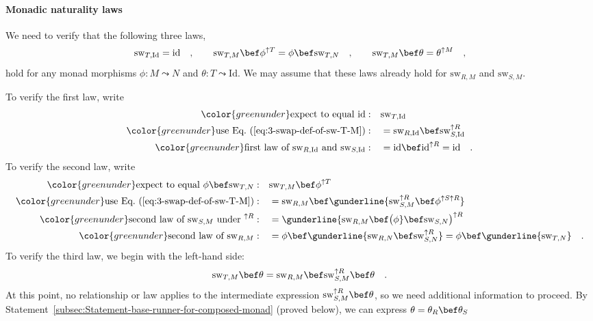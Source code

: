 \paragraph{Monadic naturality laws}

We need to verify that the following three laws,
\[
\text{sw}_{T,\text{Id}}=\text{id}\quad,\quad\quad\text{sw}_{T,M}\bef\phi^{\uparrow T}=\phi\bef\text{sw}_{T,N}\quad,\quad\quad\text{sw}_{T,M}\bef\theta=\theta^{\uparrow M}\quad,
\]
hold for any monad morphisms $\phi:M\leadsto N$ and $\theta:T\leadsto\text{Id}$.
We may assume that these laws already hold for $\text{sw}_{R,M}$
and $\text{sw}_{S,M}$.

To verify the first law, write
\begin{align*}
{\color{greenunder}\text{expect to equal }\text{id}:}\quad & \text{sw}_{T,\text{Id}}\\
{\color{greenunder}\text{use Eq.~(\ref{eq:3-swap-def-of-sw-T-M})}:}\quad & =\text{sw}_{R,\text{Id}}\bef\text{sw}_{S,\text{Id}}^{\uparrow R}\\
{\color{greenunder}\text{first law of }\text{sw}_{R,\text{Id}}\text{ and }\text{sw}_{S,\text{Id}}:}\quad & =\text{id}\bef\text{id}^{\uparrow R}=\text{id}\quad.
\end{align*}
To verify the second law, write
\begin{align*}
{\color{greenunder}\text{expect to equal }\phi\bef\text{sw}_{T,N}:}\quad & \text{sw}_{T,M}\bef\phi^{\uparrow T}\\
{\color{greenunder}\text{use Eq.~(\ref{eq:3-swap-def-of-sw-T-M})}:}\quad & =\text{sw}_{R,M}\bef\gunderline{\text{sw}_{S,M}^{\uparrow R}\bef\phi^{\uparrow S\uparrow R}}\\
{\color{greenunder}\text{second law of }\text{sw}_{S,M}\text{ under }^{\uparrow R}:}\quad & =\gunderline{\text{sw}_{R,M}\bef\big(\phi}\bef\text{sw}_{S,N}\big)^{\uparrow R}\\
{\color{greenunder}\text{second law of }\text{sw}_{R,M}:}\quad & =\phi\bef\gunderline{\text{sw}_{R,N}\bef\text{sw}_{S,N}^{\uparrow R}}=\phi\bef\gunderline{\text{sw}_{T,N}}\quad.
\end{align*}
To verify the third law, we begin with the left-hand side:
\[
\text{sw}_{T,M}\bef\theta=\text{sw}_{R,M}\bef\text{sw}_{S,M}^{\uparrow R}\bef\theta\quad.
\]
At this point, no relationship or law applies to the intermediate
expression $\text{sw}_{S,M}^{\uparrow R}\bef\theta$, so we need additional
information to proceed. By Statement~\ref{subsec:Statement-base-runner-for-composed-monad}
(proved below), we can express $\theta=\theta_{R}\bef\theta_{S}$
